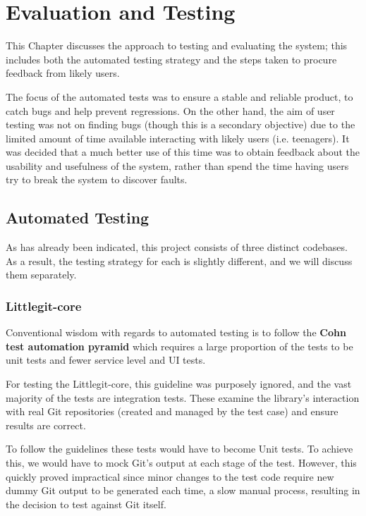 \chapter{Evaluation and Testing}

This Chapter discusses the approach to testing and evaluating the system; this includes both the automated testing strategy and the steps taken to procure feedback from likely users. 

The focus of the automated tests was to ensure a stable and reliable product, to catch bugs and help prevent regressions. On the other hand, the aim of user testing was not on finding bugs (though this is a secondary objective) due to the limited amount of time available interacting with likely users (i.e. teenagers). It was decided that a much better use of this time was to obtain feedback about the usability and usefulness of the system, rather than spend the time having users try to break the system to discover faults.

\section{Automated Testing}

As has already been indicated, this project consists of three distinct codebases. As a result, the testing strategy for each is slightly different, and we will discuss them separately. 

\subsection{Littlegit-core}

Conventional wisdom with regards to automated testing is to follow the \textbf{Cohn test automation pyramid} \cite{testpyramid} which requires a large proportion of the tests to be unit tests and fewer service level and UI tests.

For testing the Littlegit-core, this guideline was purposely ignored, and the vast majority of the tests are integration tests. These examine the library's interaction with real Git repositories (created and managed by the test case) and ensure results are correct. 

To follow the guidelines these tests would have to become Unit tests. To achieve this, we would have to mock Git's output at each stage of the test. However, this quickly proved impractical since minor changes to the test code require new dummy Git output to be generated each time, a slow manual process, resulting in the decision to test against Git itself.

